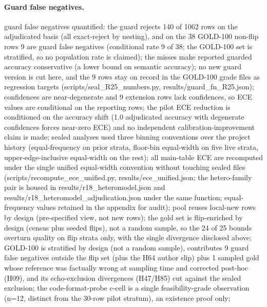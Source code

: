 \documentclass[10pt]{article} %
\begin{document}
\paragraph*{Guard false negatives.} guard false negatives quantified: the guard rejects 140 of 1062 rows on the adjudicated basis (all exact-reject by nesting), and on the 38 GOLD-100 non-flip rows 9 are guard false negatives (conditional rate 9 of 38; the GOLD-100 set is stratified, so no population rate is claimed); the misses make reported guarded accuracy conservative (a lower bound on semantic accuracy); no new guard version is cut here, and the 9 rows stay on record in the GOLD-100 grade files as regression targets (scripts/seal\_R25\_numbers.py, results/guard\_fn\_R25.json); confidences are near-degenerate and 9 extension rows lack confidences, so ECE values are conditional on the reporting rows; the pilot ECE reduction is conditioned on the accuracy shift (1.0 adjudicated accuracy with degenerate confidences forces near-zero ECE) and no independent calibration-improvement claim is made; sealed analyses used three binning conventions over the project history (equal-frequency on prior strata, floor-bin equal-width on five live strata, upper-edge-inclusive equal-width on the rest); all main-table ECE are recomputed under the single unified equal-width convention without touching sealed files (scripts/recompute\_ece\_unified.py, results/ece\_unified.json; the hetero-family pair is housed in results/r18\_heteromodel.json and results/r18\_heteromodel\_adjudication.json under the same function; equal-frequency values retained in the appendix for audit); pool reuses local-new rows by design (pre-specified view, not new rows); the gold set is flip-enriched by design (census plus seeded flips), not a random sample, so the 24 of 25 bounds overturn quality on flip strata only, with the single divergence disclosed above; GOLD-100 is stratified by design (not a random sample), contributes 9 guard false negatives outside the flip set (plus the H64 author slip) plus 1 sampled gold whose reference was factually wrong at sampling time and corrected post-hoc (H09), and its echo-exclusion divergences (H47/H85) cut against the sealed exclusion; the code-format-probe c-cell is a single feasibility-grade observation (n=12, distinct from the 30-row pilot stratum), an existence proof only;
\end{document}
